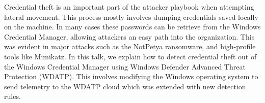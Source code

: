 \def\abstracttitle{"May I see your credentials, please?"}
\def\abstractcomment{Regular Talk}
\def\abstractowner{Dana Baril}

\thispagestyle{abstract}

Credential theft is an important part of the attacker playbook when attempting lateral movement. This process mostly involves dumping credentials saved locally on the machine. In many cases these passwords can be retrieve from the Windows Credential Manager, allowing attackers an easy path into the organization. This was evident in major attacks such as the NotPetya ransomware, and high-profile tools like Mimikatz.
In this talk, we explain how to detect credential theft out of the Windows Credential Manager using Windows Defender Advanced Threat Protection (WDATP). This involves modifying the Windows operating system to send telemetry to the WDATP cloud which was extended with new detection rules.
